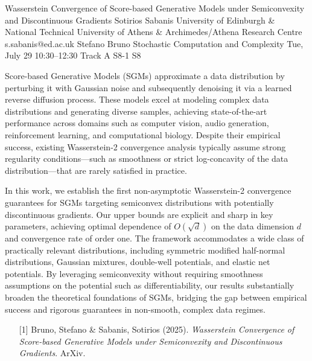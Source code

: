 \begin{talk}
  {Wasserstein Convergence of Score-based Generative Models under Semiconvexity and Discontinuous Gradients}%
  {Sotirios Sabanis}%
  {University of Edinburgh \& National Technical University of Athens \& Archimedes/Athena Research Centre}%
  {s.sabanis@ed.ac.uk}%
  {Stefano Bruno}%
  {Stochastic Computation and Complexity}%
  {Tue, July 29 10:30–12:30 Track A}%
  {S8-1}%
  {S8}%
				
			
\noindent Score-based Generative Models (SGMs) approximate a data distribution by perturbing it with Gaussian noise and subsequently denoising it via a learned reverse diffusion process. These models excel at modeling complex data distributions and generating diverse samples, achieving state-of-the-art performance across domains such as computer vision, audio generation, reinforcement learning, and computational biology. Despite their empirical success, existing Wasserstein-2 convergence analysis typically assume strong regularity conditions—such as smoothness or strict log-concavity of the data distribution—that are rarely satisfied in practice.
		
	\noindent	In this work, we establish the first non-asymptotic Wasserstein-2 convergence guarantees for SGMs targeting semiconvex distributions with potentially discontinuous gradients. Our upper bounds are explicit and sharp in key parameters, achieving optimal dependence of $O(\sqrt{d})$ on the data dimension $d$ and convergence rate of order one. The framework accommodates a wide class of practically relevant distributions, including symmetric modified half-normal distributions, Gaussian mixtures, double-well potentials, and elastic net potentials. By leveraging semiconvexity without requiring smoothness assumptions on the potential such as differentiability, our results substantially broaden the theoretical foundations of SGMs, bridging the gap between empirical success and rigorous guarantees in non-smooth, complex data regimes.

\medskip


\begin{enumerate}
	\item[{[1]}] Bruno, Stefano \& Sabanis, Sotirios (2025). {\it Wasserstein Convergence of Score-based Generative Models under Semiconvexity and Discontinuous Gradients}. ArXiv.
\end{enumerate}


\end{talk}

